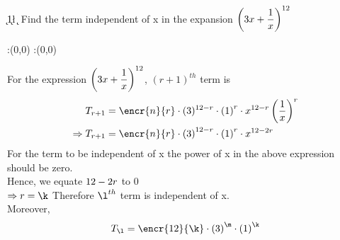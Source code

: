 


\DIVIDE{}\k 
\ADD\k{1}\l
\SUBTRACT\vbthree\k\m
\question[4] Find the term independent of x in the expansion $\left({3 x + \dfrac{1}{x}}\right)^{12}$


\watchout

\ifprintanswers
  \begin{marginfigure}
      :(0,0)
      :(0,0)
    \figdrawbegin{}
      \figdrawline [100,101]
    \figdrawend
    \figvisu{\figBoxA}{}{%
    }
    \centerline{\box\figBoxA}
  \end{marginfigure}
\fi 

\begin{solution}[\halfpage]
For the expression $\left(3 x + \dfrac{1}{x}\right)^{12}$, $(r+1)^{th}$ term is 
	\begin{align}
	T_{r+1} &= \encr{n}{r} \cdot (\vbone)^{\vbthree - r}\cdot \left( \vbtwo \right)^{r} \cdot {x}^{\vbthree - r}  \left(\dfrac{1}{x}\right)^{r}\\
	\Rightarrow T_{r+1} &= \encr{n}{r} \cdot \left( \vbone \right)^{\vbthree - r}\cdot \left( \vbtwo \right)^{r} \cdot {x}^{\vbthree - 2r} \\
	\end{align}
For the term to be independent of x the power of x in the above expression should be zero.\\
Hence, we equate $12 - 2r$ to $0$\\
$\Rightarrow r = \k \\$
Therefore ${\l}^{th}$ term is independent of x.\\
Moreover, 
	\begin{align}
	{T}_{\l} = \encr{\vbthree}{\k} \cdot \left( \vbone \right)^{\m}\cdot \left( \vbtwo \right)^{\k}
	 \end{align}
\end{solution}

